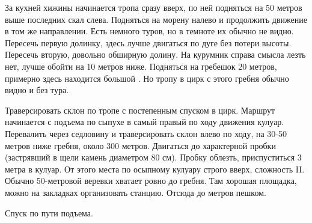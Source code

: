 За кухней хижины \geoLighthouse начинается тропа сразу вверх, по ней
подняться на 50 метров выше последних скал слева. Подняться на морену
налево и продолжить движение в том же направлении. Есть немного туров,
но в темноте их обычно не видно. Пересечь первую долинку, здесь лучше
двигаться по дуге без потери высоты. Пересечь вторую, довольно
обширную долину. На курумник справа смысла лезть нет, лучше обойти на
10 метров ниже. Подняться на гребешок 20 метров, примерно здесь
находится большой \geoStartOfKoshevoy[тур]. Но тропу в цирк
\geoPeakKoshevoy с этого гребня обычно видно и без тура.

Траверсировать склон по тропе с постепенным спуском в цирк. Маршрут
начинается с подъема по сыпухе в самый правый по ходу движения кулуар.
Перевалить через седловину и траверсировать склон влево по ходу, на
30-50 метров ниже гребня, около 300 метров. Двигаться до характерной
пробки (застрявший в щели камень диаметром 80 см). Пробку облезть,
приспуститься 3 метра в кулуар. От этого места по осыпному кулуару
строго вверх, сложность II. Обычно 50-метровой веревки хватает ровно
до гребня. Там хорошая площадка, можно на закладках организовать
станцию. Отсюда до  метров пешком.

Спуск по пути подъема.
